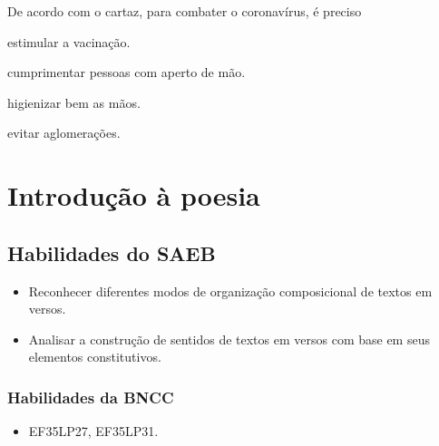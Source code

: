 De acordo com o cartaz, para combater o coronavírus, é preciso

\begin{minipage}{.5\textwidth}
\begin{escolha}
\item estimular a vacinação.

\item cumprimentar pessoas com aperto de mão.

\item higienizar bem as mãos.

\item evitar aglomerações.
\end{escolha}
\end{minipage}


\chapter{Introdução à poesia}

\vspace*{-1cm}

\section*{Habilidades do SAEB}

\begin{itemize}
\item Reconhecer diferentes modos de organização composicional de textos em
versos.

\item Analisar a construção de sentidos de textos em versos com base em seus
elementos constitutivos.
\end{itemize}

\subsection{Habilidades da BNCC}

\begin{itemize}
\item EF35LP27, EF35LP31.
\end{itemize}

